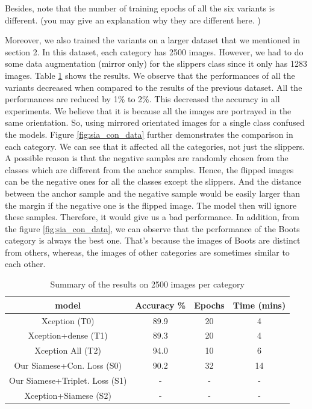 Besides, note that the number of training epochs of all the six variants is different. (you may give an explanation why they are different here. )


Moreover, we also trained the variants on a larger dataset that we mentioned in section 2. In this dataset, each category has 2500 images. However, we had to do some data augmentation (mirror only) for the slippers class since it only has 1283 images. Table \ref{table:resultB} shows the results. We observe that the performances of all the variants decreased when compared to the results of the previous dataset. All the performances are reduced by 1\% to 2\%. This decreased the accuracy in all experiments. We believe that it is because all the images are portrayed in the same orientation. So, using mirrored orientated images for a single class confused the models.  Figure \ref{fig:sia_con_data} further demonstrates the comparison in each category. We can see that it affected all the categories, not just the slippers.  A possible reason is that the negative samples are randomly chosen from the classes which are different from the anchor samples. Hence, the flipped images can be the negative ones for all the classes except the slippers. And the distance between the anchor sample and the negative sample would be easily larger than the margin if the negative one is the flipped image. The model then will ignore these samples. Therefore, it would give us a bad performance. In addition, from the figure \ref{fig:sia_con_data}, we can observe that the performance of the Boots category is always the best one. That's because the images of Boots are distinct from others, whereas, the images of other categories are sometimes similar to each other. 

\begin{table}[ht]
    \caption{Summary of the results on 2500 images per category} 
    \centering 
    \begin{tabular}{c c c c} 
    \hline\hline   
    model & Accuracy \% & Epochs & Time (mins)  \\%
    \hline %
    Xception (T0) & 89.9 & 20 & 4 \\%
    Xception+dense (T1) & 89.3 & 20 & 4 \\%
    Xception All (T2) & 94.0 & 10 & 6 \\%
    Our Siamese+Con. Loss (S0) & 90.2 & 32 & 14 \\%
    Our Siamese+Triplet. Loss (S1) & - & - & - \\%
    Xception+Siamese (S2) & - & - & - \\%
    \hline 
    \end{tabular}
\label{table:resultB} %
\end{table}

